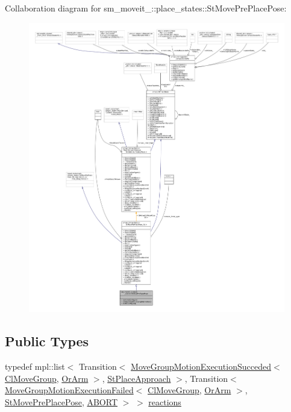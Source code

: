 Collaboration diagram for sm\+\_\+moveit\+\_\+:\+:place\+\_\+states\+:\+:St\+Move\+Pre\+Place\+Pose\+:
\nopagebreak
\begin{figure}[H]
\begin{center}
\leavevmode
\includegraphics[width=350pt]{structsm__moveit__2_1_1place__states_1_1StMovePrePlacePose__coll__graph}
\end{center}
\end{figure}
\subsection*{Public Types}
\begin{DoxyCompactItemize}
\item 
typedef mpl\+::list$<$ Transition$<$ \hyperlink{structmove__group__interface__client_1_1MoveGroupMotionExecutionSucceded}{Move\+Group\+Motion\+Execution\+Succeded}$<$ \hyperlink{classmove__group__interface__client_1_1ClMoveGroup}{Cl\+Move\+Group}, \hyperlink{classsm__moveit__2_1_1OrArm}{Or\+Arm} $>$, \hyperlink{structsm__moveit__2_1_1place__states_1_1StPlaceApproach}{St\+Place\+Approach} $>$, Transition$<$ \hyperlink{structmove__group__interface__client_1_1MoveGroupMotionExecutionFailed}{Move\+Group\+Motion\+Execution\+Failed}$<$ \hyperlink{classmove__group__interface__client_1_1ClMoveGroup}{Cl\+Move\+Group}, \hyperlink{classsm__moveit__2_1_1OrArm}{Or\+Arm} $>$, \hyperlink{structsm__moveit__2_1_1place__states_1_1StMovePrePlacePose}{St\+Move\+Pre\+Place\+Pose}, \hyperlink{classABORT}{A\+B\+O\+RT} $>$ $>$ \hyperlink{structsm__moveit__2_1_1place__states_1_1StMovePrePlacePose_a89ad0cbb7a2a3fc1bbac9b56171861ed}{reactions}
\end{DoxyCompactItemize}
